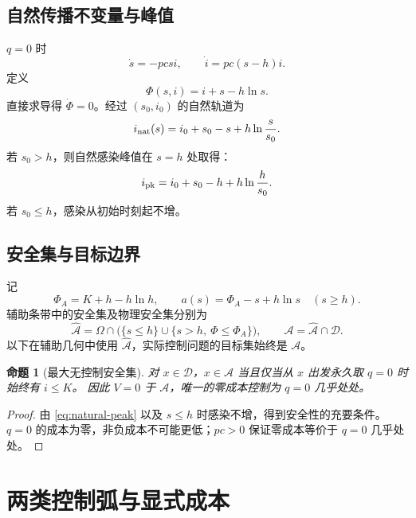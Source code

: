 \documentclass[11pt,a4paper,UTF8]{ctexart}
\newtheorem{proposition}[theorem]{命题}
\theoremstyle{definition}
\newcommand{\Acal}{\mathcal A}
\newcommand{\Dcal}{\mathcal D}
\begin{document}
\subsection{自然传播不变量与峰值}
$q=0$ 时
\begin{equation}
\dot s=-pcsi,\qquad \dot i=pc(s-h)i.
\label{eq:q0-system}
\end{equation}
定义
\begin{equation}
\Phi(s,i)=i+s-h\ln s.
\label{eq:Phi}
\end{equation}
直接求导得 $\dot\Phi=0$。经过 $(s_0,i_0)$ 的自然轨道为
\begin{equation}
i_{\rm nat}(s)=i_0+s_0-s+h\ln\frac{s}{s_0}.
\label{eq:natural-orbit}
\end{equation}
若 $s_0>h$，则自然感染峰值在 $s=h$ 处取得：
\begin{equation}
i_{\rm pk}=i_0+s_0-h+h\ln\frac h{s_0}.
\label{eq:natural-peak}
\end{equation}
若 $s_0\le h$，感染从初始时刻起不增。

\subsection{安全集与目标边界}
记
\begin{equation}
\Phi_A=K+h-h\ln h,\qquad
 a(s)=\Phi_A-s+h\ln s\quad(s\ge h).
\label{eq:safe-boundary}
\end{equation}
辅助条带中的安全集及物理安全集分别为
\begin{equation}
\widehat{\Acal}=\Omega\cap\bigl(\{s\le h\}\cup\{s>h,\ \Phi\le\Phi_A\}\bigr),
\qquad \Acal=\widehat{\Acal}\cap\Dcal.
\label{eq:safe-set}
\end{equation}
以下在辅助几何中使用 $\widehat{\Acal}$，实际控制问题的目标集始终是 $\Acal$。

\begin{proposition}[最大无控制安全集]
\label{prop:safe-exact}
对 $x\in\Dcal$，$x\in\Acal$ 当且仅当从 $x$ 出发永久取 $q=0$ 时始终有 $i\le K$。
因此 $V=0$ 于 $\Acal$，唯一的零成本控制为 $q=0$ 几乎处处。
\end{proposition}
\begin{proof}
由 \eqref{eq:natural-peak} 以及 $s\le h$ 时感染不增，得到安全性的充要条件。
$q=0$ 的成本为零，非负成本不可能更低；$pc>0$ 保证零成本等价于 $q=0$ 几乎处处。
\end{proof}

\section{两类控制弧与显式成本}
\label{sec:arcs}
\end{document}
